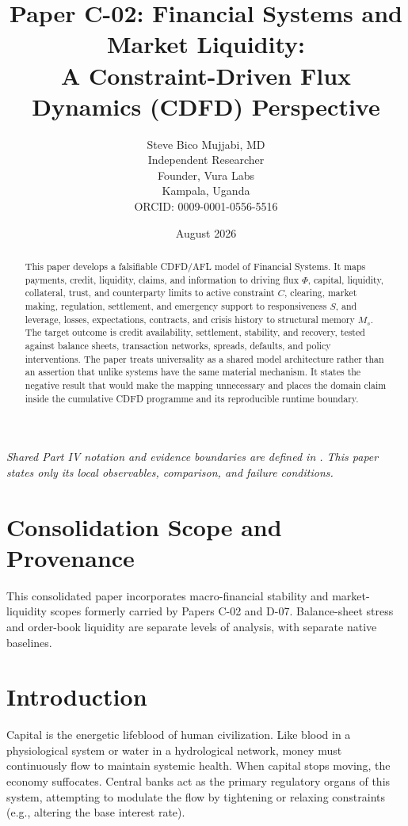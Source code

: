 \documentclass[11pt,a4paper]{article}
\title{\textbf{Paper C-02: Financial Systems and Market Liquidity:\\ A Constraint-Driven Flux Dynamics (CDFD) Perspective}}
\author{Steve Bico Mujjabi, MD\\
\small Independent Researcher\\
\small Founder, Vura Labs\\
\small Kampala, Uganda\\
\small ORCID: 0009-0001-0556-5516}
\date{August 2026}
\begin{document}
\maketitle

\noindent\textit{Shared Part IV notation and evidence boundaries are defined in . This paper states only its local observables, comparison, and failure conditions.}


\begin{abstract}
This paper develops a falsifiable CDFD/AFL model of Financial Systems. It maps payments, credit, liquidity, claims, and information to driving flux $\Phi$, capital, liquidity, collateral, trust, and counterparty limits to active constraint $C$, clearing, market making, regulation, settlement, and emergency support to responsiveness $S$, and leverage, losses, expectations, contracts, and crisis history to structural memory $M_s$. The target outcome is credit availability, settlement, stability, and recovery, tested against balance sheets, transaction networks, spreads, defaults, and policy interventions. The paper treats universality as a shared model architecture rather than an assertion that unlike systems have the same material mechanism. It states the negative result that would make the mapping unnecessary and places the domain claim inside the cumulative CDFD programme and its reproducible runtime boundary.
\end{abstract}
\section*{Consolidation Scope and Provenance}
This consolidated paper incorporates macro-financial stability and market-liquidity scopes formerly carried by Papers C-02 and D-07. Balance-sheet stress and order-book liquidity are separate levels of analysis, with separate native baselines.


\section{Introduction}

Capital is the energetic lifeblood of human civilization. Like blood in a physiological system or water in a hydrological network, money must continuously flow to maintain systemic health. When capital stops moving, the economy suffocates. Central banks act as the primary regulatory organs of this system, attempting to modulate the flow by tightening or relaxing constraints (e.g., altering the base interest rate).
\end{document}
